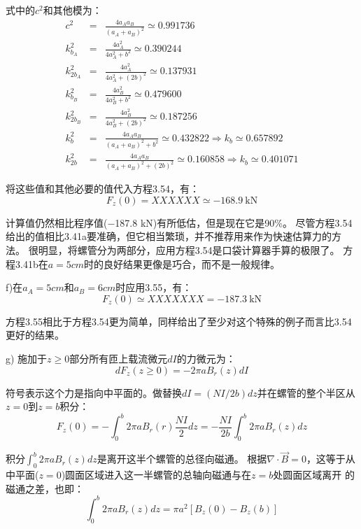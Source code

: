 式中的$c^2$和其他模为：
\begin{eqnarray}
c^2&=&\frac{4a_A a_B}{(a_A+a_B)^2}\simeq 0.991736\\
k_{b_A}^2&=&\frac{4a_A^2}{4a_A^2+b^2}\simeq 0.390244\\
k_{2b_A}^2&=&\frac{4a_A^2}{4a_A^2+(2b)^2}\simeq 0.137931\\
k_{b_B}^2&=&\frac{4a_B^2}{4a_B^2+b^2}\simeq 0.479600\\
k_{2b_B}^2&=&\frac{4a_B^2}{4a_B^2+(2b)^2}\simeq 0.187256\\
k_{b}^2&=&\frac{4a_A a_B}{(a_A+a_B)^2+b^2}\simeq 0.432822\Rightarrow k_b\simeq 0.657892\\
k_{2b}^2&=&\frac{4a_A a_B}{(a_A+a_B)^2+(2b)^2}\simeq 0.160858\Rightarrow k_b\simeq 0.401071
\end{eqnarray}

将这些值和其他必要的值代入方程3.54，有：
\begin{equation}
F_z(0)= XXXXXX \simeq -168.9\ \mathrm{kN}
\end{equation}

计算值仍然相比程序值(−187.8 kN)有所低估，但是现在它是90\%。
尽管方程3.54给出的值相比3.41a要准确，但它相当繁琐，并不推荐用来作为快速估算力的方法。
很明显，将螺管分为两部分，应用方程3.54是口袋计算器手算的极限了。
方程3.41b在$a=5cm$时的良好结果更像是巧合，而不是一般规律。

f)在$a_A=5cm$和$a_B=6cm$时应用3.55，有：
\begin{equation}
F_z(0)\simeq XXXXXXX = -187.3\ \mathrm{kN}
\end{equation}

方程3.55相比于方程3.54更为简单，同样给出了至少对这个特殊的例子而言比3.54更好的结果。

g) 施加于$z\ge 0$部分所有匝上载流微元$dI$的力微元为：
\begin{equation*}
dF_z(z\ge 0)=-2\pi a B_r(z)d I
\end{equation*}

符号表示这个力是指向中平面的。做替换$dI = (NI/2b) dz$并在螺管的整个半区从$z=0$到$z=b$积分： 
\begin{equation}
F_{z}(0)=-\int_{0}^{b}2\pi aB_{r}(r)\frac{NI}{2}dz=-\frac{NI}{2b}\int_{0}^{b}2\pi aB_{r}(z)dz%
\end{equation}

积分$\int_0^b 2\pi a B_r(z)dz$是离开这半个螺管的总径向磁通。
根据$\nabla\cdot \vec{B}=0$，这等于从中平面($z=0$)圆面区域进入这一半螺管的总轴向磁通与在$z=b$处圆面区域离开
的磁通之差，也即：
\begin{equation}
\int_{0}^{b}2\pi aB_{r}(z)dz=\pi a^{2}[B_{z}(0)-B_{z}(b)]%
\end{equation}

